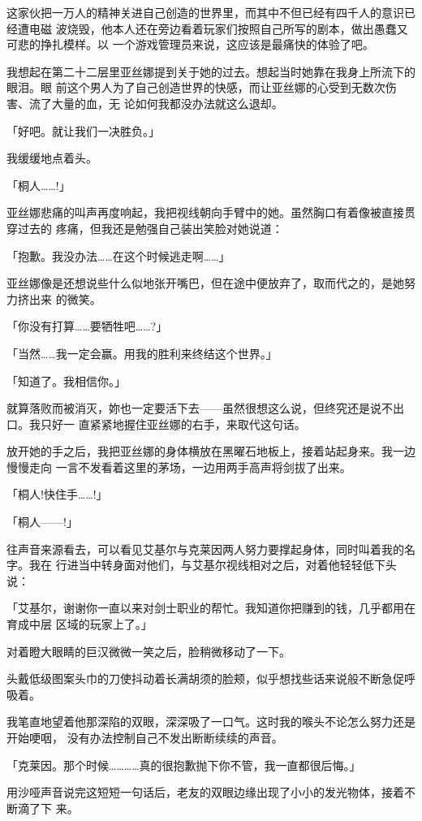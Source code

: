 \documentclass[11pt]{book}
\begin{document}
这家伙把一万人的精神关进自己创造的世界里，而其中不但已经有四千人的意识已经遭电磁
波烧毁，他本人还在旁边看着玩家们按照自己所写的剧本，做出愚蠢又可悲的挣扎模样。以
一个游戏管理员来说，这应该是最痛快的体验了吧。

我想起在第二十二层里亚丝娜提到关于她的过去。想起当时她靠在我身上所流下的眼泪。眼
前这个男人为了自己创造世界的快感，而让亚丝娜的心受到无数次伤害、流了大量的血，无
论如何我都没办法就这么退却。

「好吧。就让我们一决胜负。」

我缓缓地点着头。

「桐人……!」

亚丝娜悲痛的叫声再度响起，我把视线朝向手臂中的她。虽然胸口有着像被直接贯穿过去的
疼痛，但我还是勉强自己装出笑脸对她说道：

「抱歉。我没办法……在这个时候逃走啊……」

亚丝娜像是还想说些什么似地张开嘴巴，但在途中便放弃了，取而代之的，是她努力挤出来
的微笑。

「你没有打算……要牺牲吧……?」

「当然……我一定会赢。用我的胜利来终结这个世界。」

「知道了。我相信你。」

就算落败而被消灭，妳也一定要活下去——虽然很想这么说，但终究还是说不出口。我只好一
直紧紧地握住亚丝娜的右手，来取代这句话。

放开她的手之后，我把亚丝娜的身体横放在黑曜石地板上，接着站起身来。我一边慢慢走向
一言不发看着这里的茅场，一边用两手高声将剑拔了出来。

「桐人!快住手……!」

「桐人——!」

往声音来源看去，可以看见艾基尔与克莱因两人努力要撑起身体，同时叫着我的名字。我在
行进当中转身面对他们，与艾基尔视线相对之后，对着他轻轻低下头说：

「艾基尔，谢谢你一直以来对剑士职业的帮忙。我知道你把赚到的钱，几乎都用在育成中层
区域的玩家上了。」

对着瞪大眼睛的巨汉微微一笑之后，脸稍微移动了一下。

头戴低级图案头巾的刀使抖动着长满胡须的脸颊，似乎想找些话来说般不断急促呼吸着。

我笔直地望着他那深陷的双眼，深深吸了一口气。这时我的喉头不论怎么努力还是开始哽咽，
没有办法控制自己不发出断断续续的声音。

「克莱因。那个时候…………真的很抱歉抛下你不管，我一直都很后悔。」

用沙哑声音说完这短短一句话后，老友的双眼边缘出现了小小的发光物体，接着不断滴了下
来。
\end{document}
